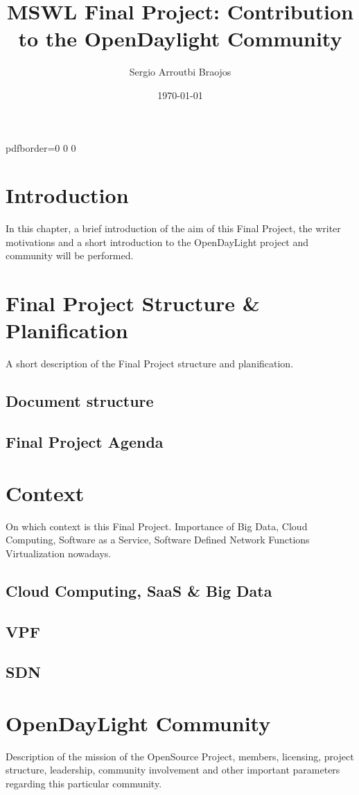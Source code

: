 \documentclass[11pt]{article}
\title{\textbf{MSWL Final Project: Contribution to the OpenDaylight Community}}
\author{Sergio Arroutbi Braojos}
\date{\today}
\begin{document}
\hypersetup
{   
pdfborder={0 0 0}
}
   
\maketitle

\tableofcontents

\pagebreak

\section{Introduction}
In this chapter, a brief introduction of the aim of this Final Project, the writer motivations and a short introduction to the OpenDayLight project and community will be performed.
\section{Final Project Structure \& Planification}
A short description of the Final Project structure and planification.
\subsection{Document structure}
\subsection{Final Project Agenda}
\section{Context}
On which context is this Final Project. Importance of Big Data, Cloud Computing, Software as a Service, Software Defined Network Functions Virtualization nowadays.
\subsection{Cloud Computing, SaaS \& Big Data}
\subsection{VPF}
\subsection{SDN}
\section{OpenDayLight Community}
Description of the mission of the OpenSource Project, members, licensing, project structure, leadership, community involvement and other important parameters regarding this particular community.
\end{document}
